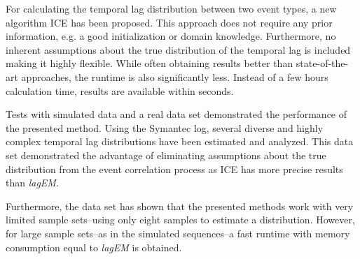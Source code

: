 \documentclass[conference]{IEEEtran}
\theoremstyle{examplestyle}
\begin{document}
For calculating the temporal lag distribution between two event types, a new algorithm \ac{ICE} has been proposed. This approach does not require any  prior information, e.g. a good initialization or domain knowledge. Furthermore, no inherent assumptions about the true distribution of the temporal lag is included making it highly flexible. While often obtaining results better than state-of-the-art approaches, the runtime is also significantly less. Instead of a few hours calculation time, results are available within seconds.

Tests with simulated data and a real data set demonstrated the performance of the presented method. Using the Symantec log, several diverse and highly complex temporal lag distributions have been estimated and analyzed. This data set demonstrated the advantage of eliminating assumptions about the true distribution from the event correlation process as \ac{ICE} has  more precise results than \textit{lagEM}.

Furthermore, the data set has shown that the presented methods work with very limited sample sets--using only eight samples to estimate a distribution. However, for large sample sets--as in the simulated sequences--a fast runtime with memory consumption equal to \textit{lagEM} is obtained.





% 
% 










\end{document}

